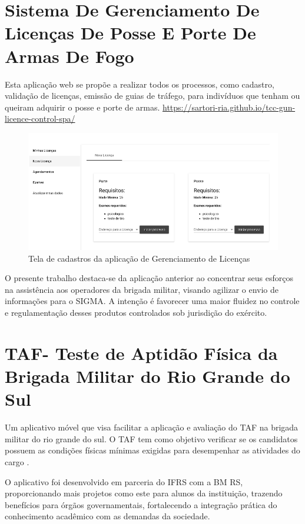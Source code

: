 \section{Sistema De Gerenciamento De Licenças De Posse E Porte De Armas De Fogo}
Esta aplicação web se propõe a realizar todos os processos, como cadastro, validação de licenças, emissão de guias de tráfego, para indivíduos que tenham ou queiram adquirir o posse e porte de armas.
\url{https://sartori-ria.github.io/tcc-gun-licence-control-spa/}
\begin{figure}[htb]
    \caption{\label{fig:grafico-sglppa} Tela de cadastros da aplicação de Gerenciamento de Licenças}
    \begin{center}
        \includegraphics[scale=0.8]{imagens/sglppa.png}
    \end{center}
\end{figure}

O presente trabalho destaca-se da aplicação anterior ao concentrar seus esforços na assistência aos operadores da brigada militar, visando agilizar o envio de informações para o SIGMA. A intenção é favorecer uma maior fluidez no controle e regulamentação desses produtos controlados sob jurisdição do exército.

\section{TAF- Teste de Aptidão Física da Brigada Militar do Rio Grande do Sul}
Um aplicativo móvel que visa facilitar a aplicação e avaliação do TAF na brigada militar do rio grande do sul. 
O TAF tem como objetivo verificar se os candidatos possuem as condições físicas mínimas exigidas para desempenhar as atividades do cargo \cite{taf}.

O aplicativo foi desenvolvido em parceria do IFRS com a BM RS, proporcionando mais projetos como este para alunos da instituição, trazendo benefícios para órgãos governamentais, fortalecendo a integração prática do conhecimento acadêmico com as demandas da sociedade.

